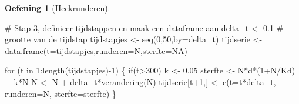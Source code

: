 \documentclass[
  a4paper,
]{scrbook}
\newenvironment{Shaded}{\begin{snugshade}}{\end{snugshade}}
\newcommand{\AttributeTok}[1]{\textcolor[rgb]{0.40,0.45,0.13}{#1}}
\newcommand{\CommentTok}[1]{\textcolor[rgb]{0.37,0.37,0.37}{#1}}
\newcommand{\ConstantTok}[1]{\textcolor[rgb]{0.56,0.35,0.01}{#1}}
\newcommand{\ControlFlowTok}[1]{\textcolor[rgb]{0.00,0.23,0.31}{#1}}
\newcommand{\DecValTok}[1]{\textcolor[rgb]{0.68,0.00,0.00}{#1}}
\newcommand{\FloatTok}[1]{\textcolor[rgb]{0.68,0.00,0.00}{#1}}
\newcommand{\FunctionTok}[1]{\textcolor[rgb]{0.28,0.35,0.67}{#1}}
\newcommand{\NormalTok}[1]{\textcolor[rgb]{0.00,0.23,0.31}{#1}}
\newcommand{\OtherTok}[1]{\textcolor[rgb]{0.00,0.23,0.31}{#1}}
\newcommand{\SpecialCharTok}[1]{\textcolor[rgb]{0.37,0.37,0.37}{#1}}
\theoremstyle{definition}
\newtheorem{exercise}{Oefening}[chapter]
\theoremstyle{remark}
\begin{document}
\begin{exercise}[Heckrunderen]
\begin{enumerate}
\begin{Shaded}
\begin{Highlighting}[]
\CommentTok{\# Stap 3, definieer tijdstappen en maak een dataframe aan}
\NormalTok{delta\_t }\OtherTok{\textless{}{-}} \FloatTok{0.1} \CommentTok{\# grootte van de tijdstap}
\NormalTok{tijdstapjes }\OtherTok{\textless{}{-}} \FunctionTok{seq}\NormalTok{(}\DecValTok{0}\NormalTok{,}\DecValTok{50}\NormalTok{,}\AttributeTok{by=}\NormalTok{delta\_t)}
\NormalTok{tijdserie }\OtherTok{\textless{}{-}} \FunctionTok{data.frame}\NormalTok{(}\AttributeTok{t=}\NormalTok{tijdstapjes,}\AttributeTok{runderen=}\NormalTok{N,}\AttributeTok{sterfte=}\ConstantTok{NA}\NormalTok{)}

\ControlFlowTok{for}\NormalTok{ (t }\ControlFlowTok{in} \DecValTok{1}\SpecialCharTok{:}\FunctionTok{length}\NormalTok{(tijdstapjes)}\SpecialCharTok{{-}}\DecValTok{1}\NormalTok{) \{}
  \ControlFlowTok{if}\NormalTok{(t}\SpecialCharTok{\textgreater{}}\DecValTok{300}\NormalTok{) k }\OtherTok{\textless{}{-}} \FloatTok{0.05}
\NormalTok{  sterfte }\OtherTok{\textless{}{-}}\NormalTok{ N}\SpecialCharTok{*}\NormalTok{d}\SpecialCharTok{*}\NormalTok{(}\DecValTok{1}\SpecialCharTok{+}\NormalTok{N}\SpecialCharTok{/}\NormalTok{Kd) }\SpecialCharTok{+}\NormalTok{ k}\SpecialCharTok{*}\NormalTok{N}
\NormalTok{  N }\OtherTok{\textless{}{-}}\NormalTok{ N }\SpecialCharTok{+}\NormalTok{ delta\_t}\SpecialCharTok{*}\FunctionTok{verandering}\NormalTok{(N)}
\NormalTok{  tijdserie[t}\SpecialCharTok{+}\DecValTok{1}\NormalTok{,] }\OtherTok{\textless{}{-}} \FunctionTok{c}\NormalTok{(}\AttributeTok{t=}\NormalTok{t}\SpecialCharTok{*}\NormalTok{delta\_t, }\AttributeTok{runderen=}\NormalTok{N, }\AttributeTok{sterfte=}\NormalTok{sterfte)}
\NormalTok{\}}


\end{Highlighting}
\end{Shaded}
\end{enumerate}
\end{exercise}
\end{document}
